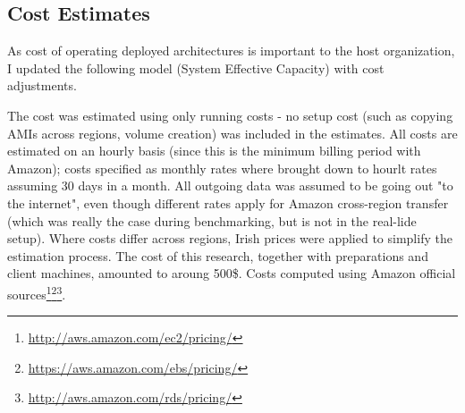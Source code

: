 \documentclass{uvamscse}
\begin{document}
\subsection{Cost Estimates}

As cost of operating deployed architectures is important to the host organization, I updated the following model (System Effective Capacity) with cost adjustments.

The cost was estimated using only running costs - no setup cost (such as copying AMIs across regions, volume creation) was included in the estimates. All costs are estimated on an hourly basis (since this is the minimum billing period with Amazon); costs specified as monthly rates where brought down to hourlt rates assuming 30 days in a month. All outgoing data was assumed to be going out "to the internet", even though different rates apply for Amazon cross-region transfer (which was really the case during benchmarking, but is not in the real-lide setup). Where costs differ across regions, Irish prices were applied to simplify the estimation process. The cost of this research, together with preparations and client machines, amounted to aroung 500\$. Costs computed using Amazon official sources\footnote{\url{http://aws.amazon.com/ec2/pricing/}}\footnote{\url{https://aws.amazon.com/ebs/pricing/}}\footnote{\url{http://aws.amazon.com/rds/pricing/}}.
\end{document}
